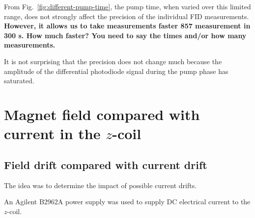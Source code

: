 From Fig.~\ref{fig:different-pump-time}, the pump time, when varied
over this limited range, does not strongly affect the precision of the
individual FID measurements.  {\bf However, it allows us to take
  measurements faster 857 measurement in 300 s.  How much faster?  You need to say the times
  and/or how many measurements.}
  

It is not surprising that the precision does not change much because
the amplitude of the differential photodiode signal during the pump
phase has saturated.



\section{Magnet field compared with current in the $z$-coil}

\subsection{Field drift compared with current drift}

The idea was to determine the impact of possible current drifts.
  
An Agilent B2962A power supply was used to supply DC electrical
current to the $z$-coil.

